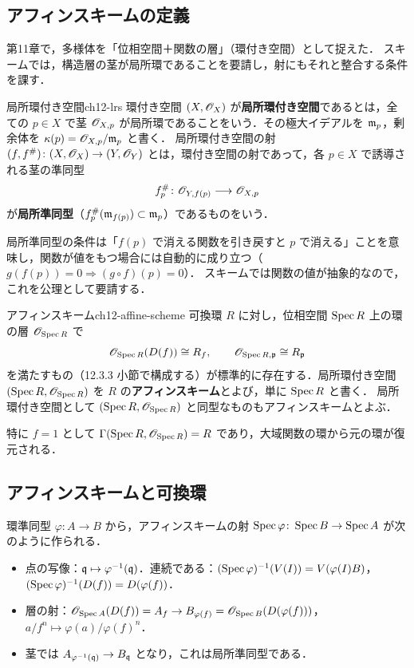 \subsection{アフィンスキームの定義}

第11章で，多様体を「位相空間＋関数の層」（環付き空間）として捉えた．
スキームでは，構造層の茎が局所環であることを要請し，射にもそれと整合する条件を課す．

\begin{mydef}{局所環付き空間}{ch12-lrs}
環付き空間 $(X,\mathscr{O}_X)$ が\textbf{局所環付き空間}であるとは，全ての $p\in X$ で茎 $\mathscr{O}_{X,p}$ が局所環であることをいう．その極大イデアルを $\mathfrak{m}_p$，剰余体を $\kappa(p)=\mathscr{O}_{X,p}/\mathfrak{m}_p$ と書く．
局所環付き空間の射 $(f,f^\#)\colon(X,\mathscr{O}_X)\to(Y,\mathscr{O}_Y)$ とは，環付き空間の射であって，各 $p\in X$ で誘導される茎の準同型
\[
  f^\#_p\colon\mathscr{O}_{Y,f(p)}\longrightarrow\mathscr{O}_{X,p}
\]
が\textbf{局所準同型}（$f^\#_p(\mathfrak{m}_{f(p)})\subset\mathfrak{m}_p$）であるものをいう．
\end{mydef}

局所準同型の条件は「$f(p)$ で消える関数を引き戻すと $p$ で消える」ことを意味し，関数が値をもつ場合には自動的に成り立つ（$g(f(p))=0\Rightarrow(g\circ f)(p)=0$）．
スキームでは関数の値が抽象的なので，これを公理として要請する．

\begin{mydef}{アフィンスキーム}{ch12-affine-scheme}
可換環 $R$ に対し，位相空間 $\operatorname{Spec} R$ 上の環の層 $\mathscr{O}_{\operatorname{Spec} R}$ で
\[
  \mathscr{O}_{\operatorname{Spec} R}(D(f))\cong R_f,\qquad \mathscr{O}_{\operatorname{Spec} R,\mathfrak{p}}\cong R_{\mathfrak{p}}
\]
を満たすもの（12.3.3 小節で構成する）が標準的に存在する．局所環付き空間 $(\operatorname{Spec} R,\mathscr{O}_{\operatorname{Spec} R})$ を $R$ の\textbf{アフィンスキーム}とよび，単に $\operatorname{Spec} R$ と書く．
局所環付き空間として $(\operatorname{Spec} R,\mathscr{O}_{\operatorname{Spec} R})$ と同型なものもアフィンスキームとよぶ．
\end{mydef}

特に $f=1$ として $\Gamma(\operatorname{Spec} R,\mathscr{O}_{\operatorname{Spec} R})=R$ であり，大域関数の環から元の環が復元される．

\subsection{アフィンスキームと可換環}

環準同型 $\varphi\colon A\to B$ から，アフィンスキームの射 $\operatorname{Spec}\varphi\colon\operatorname{Spec} B\to\operatorname{Spec} A$ が次のように作られる．
\begin{itemize}
  \item 点の写像：$\mathfrak{q}\mapsto\varphi^{-1}(\mathfrak{q})$．連続である：$(\operatorname{Spec}\varphi)^{-1}(V(I))=V(\varphi(I)B)$，$(\operatorname{Spec}\varphi)^{-1}(D(f))=D(\varphi(f))$．
  \item 層の射：$\mathscr{O}_{\operatorname{Spec} A}(D(f))=A_f\to B_{\varphi(f)}=\mathscr{O}_{\operatorname{Spec} B}(D(\varphi(f)))$，$a/f^n\mapsto\varphi(a)/\varphi(f)^n$．
  \item 茎では $A_{\varphi^{-1}(\mathfrak{q})}\to B_{\mathfrak{q}}$ となり，これは局所準同型である．
\end{itemize}

